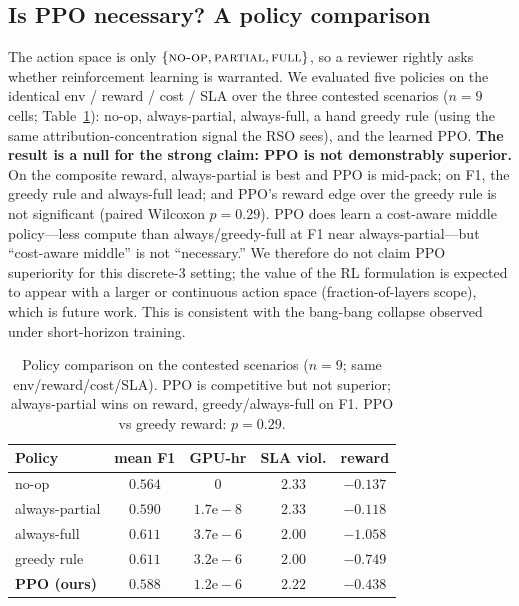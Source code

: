 \documentclass[conference]{IEEEtran}
\begin{document}
\subsection{Is PPO necessary? A policy comparison}\label{sec:ppo-necessity}
The action space is only $\{\textsc{no-op},\textsc{partial},\textsc{full}\}$,
so a reviewer rightly asks whether reinforcement learning is warranted. We
evaluated five policies on the identical env / reward / cost / SLA over the
three contested scenarios ($n{=}9$ cells; Table~\ref{tab:ppo}): no-op,
always-partial, always-full, a hand greedy rule (using the same
attribution-concentration signal the RSO sees), and the learned PPO.
\textbf{The result is a null for the strong claim: PPO is not demonstrably
superior.} On the composite reward, always-partial is best and PPO is
mid-pack; on F1, the greedy rule and always-full lead; and PPO's reward edge
over the greedy rule is not significant (paired Wilcoxon $p=0.29$). PPO does
learn a cost-aware middle policy---less compute than always/greedy-full at
F1 near always-partial---but ``cost-aware middle'' is not ``necessary.'' We
therefore do not claim PPO superiority for this discrete-3 setting; the value
of the RL formulation is expected to appear with a larger or continuous
action space (fraction-of-layers scope), which is future work. This is
consistent with the bang-bang collapse observed under short-horizon training.

\begin{table}[t]
\centering
\caption{Policy comparison on the contested scenarios ($n{=}9$; same
env/reward/cost/SLA). PPO is competitive but not superior; always-partial
wins on reward, greedy/always-full on F1. PPO vs greedy reward: $p=0.29$.}
\label{tab:ppo}
\setlength{\tabcolsep}{4pt}
\begin{tabular}{@{}lcccc@{}}
\toprule
\textbf{Policy} & \textbf{mean F1} & \textbf{GPU-hr} & \textbf{SLA viol.} & \textbf{reward}\\
\midrule
no-op            & $0.564$ & $0$        & $2.33$ & $-0.137$\\
always-partial   & $0.590$ & $1.7\mathrm{e}{-}8$ & $2.33$ & $\mathbf{-0.118}$\\
always-full      & $0.611$ & $3.7\mathrm{e}{-}6$ & $2.00$ & $-1.058$\\
greedy rule      & $\mathbf{0.611}$ & $3.2\mathrm{e}{-}6$ & $2.00$ & $-0.749$\\
\textbf{PPO (ours)} & $0.588$ & $1.2\mathrm{e}{-}6$ & $2.22$ & $-0.438$\\
\bottomrule
\end{tabular}
\end{table}
\end{document}
